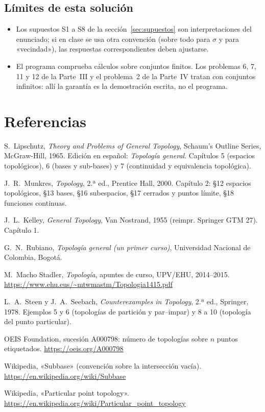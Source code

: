 \subsection{Límites de esta solución}
\begin{itemize}
\item Los supuestos S1 a S8 de la sección~\ref{sec:supuestos} son interpretaciones del enunciado; si en clase se usa
otra convención (sobre todo para $\sigma$ y para «vecindad»), las respuestas correspondientes deben ajustarse.
\item El programa comprueba cálculos sobre conjuntos finitos. Los problemas 6, 7, 11 y 12 de la Parte~III y el
problema~2 de la Parte~IV tratan con conjuntos infinitos: allí la garantía es la demostración escrita, no el
programa.
\end{itemize}

\section*{Referencias}
\begin{enumerate}[label={[\arabic*]},leftmargin=2.4em,itemsep=0.35em]\small\sloppy
\item S.~Lipschutz, \emph{Theory and Problems of General Topology}, Schaum's Outline Series, McGraw-Hill, 1965.
Edición en español: \emph{Topología general}. Capítulos 5 (espacios topológicos), 6 (bases y sub-bases) y 7
(continuidad y equivalencia topológica).
\item J.~R.~Munkres, \emph{Topology}, 2.ª ed., Prentice Hall, 2000. Capítulo 2: §12 espacios topológicos, §13 bases,
§16 subespacios, §17 cerrados y puntos límite, §18 funciones continuas.
\item J.~L.~Kelley, \emph{General Topology}, Van Nostrand, 1955 (reimpr. Springer GTM 27). Capítulo 1.
\item G.~N.~Rubiano, \emph{Topología general (un primer curso)}, Universidad Nacional de Colombia, Bogotá.
\item M.~Macho Stadler, \emph{Topología}, apuntes de curso, UPV/EHU, 2014--2015.
\url{https://www.ehu.eus/~mtwmastm/Topologia1415.pdf}
\item L.~A.~Steen y J.~A.~Seebach, \emph{Counterexamples in Topology}, 2.ª ed., Springer, 1978. Ejemplos 5 y 6
(topologías de partición y par--impar) y 8 a 10 (topología del punto particular).
\item OEIS Foundation, sucesión A000798: número de topologías sobre $n$ puntos etiquetados.
\url{https://oeis.org/A000798}
\item Wikipedia, «Subbase» (convención sobre la intersección vacía). \url{https://en.wikipedia.org/wiki/Subbase}
\item Wikipedia, «Particular point topology». \url{https://en.wikipedia.org/wiki/Particular_point_topology}
\end{enumerate}

